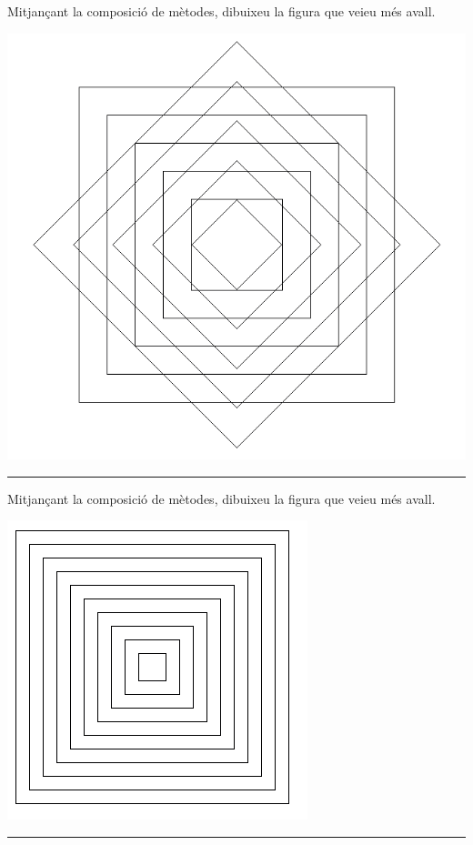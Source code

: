 \begin{center}
\colorbox{black}{}
\end{center}
{\small
\noindent
Mitjançant la composició de mètodes, dibuixeu la figura que veieu més avall.}
\begin{center}
\includegraphics[scale=0.25]{Imatges/figuraE16-1.png} 
\end{center}
\noindent
\rule{\textwidth}{3pt}
\newpage
\begin{center}
\colorbox{black}{}
\end{center}
{\small
\noindent
Mitjançant la composició de mètodes, dibuixeu la figura que veieu més avall.}
\begin{center}
\includegraphics[scale=0.4]{Imatges/figuraE16-2.png} 
\end{center}
\noindent
\rule{\textwidth}{3pt}

